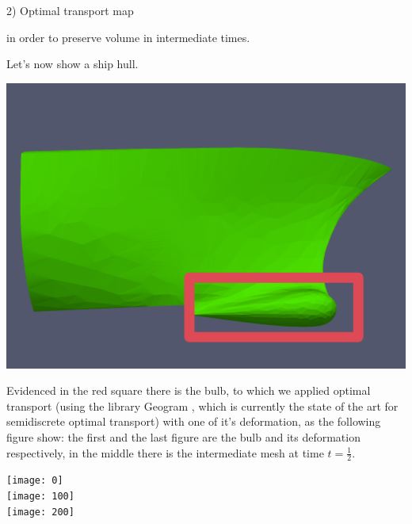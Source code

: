 \documentclass[b0paper,portrait]{baposter}
\begin{document}
\begin{poster}
\begin{posterbox}[name=otm,below=introduction,span=6,column=0]{2) Optimal transport map}
\begin{minipage}{0.48\textwidth}
in order to preserve volume in intermediate times.\\
\end{minipage}
\hspace{.2cm}
\begin{minipage}{0.46\textwidth}
Let's now show a ship hull.\\
\begin{center}
\includegraphics[scale=0.075]{ship} 
\end{center}
Evidenced in the red square there is the bulb, to which we applied optimal transport (using the library Geogram \cite{geogram}, which is currently the state of the art for semidiscrete optimal transport) with one of it's deformation, as the following figure show: the first and the last figure are the bulb and its deformation respectively, in the middle there is the intermediate mesh at time $t=\frac{1}{2}$.
\begin{center}
\texttt{[image: 0]} \\
\texttt{[image: 100]}\\
\texttt{[image: 200]}\\
\end{center}
\end{minipage}
\end{posterbox}


\end{poster}
\end{document}
